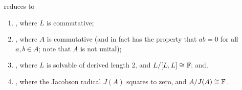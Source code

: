 \documentclass[11pt]{article}
\begin{document}
\begin{corollary}
\ThreeTIlong reduces to
\begin{enumerate}
\item {}, where $L$ is commutative; 

\item {}, where $A$ is commutative (and in fact has the property that $ab=0$ for all $a,b \in A$; note that $A$ is not unital); 

\item {}, where $L$ is solvable of derived length 2, and $L / [L, L] \cong \mathbb{F}$; and, 

\item {}, where the Jacobson radical $J(A)$ squares to zero, and $A / J(A) \cong \mathbb{F}$.
\end{enumerate}
\end{corollary}
\end{document}
